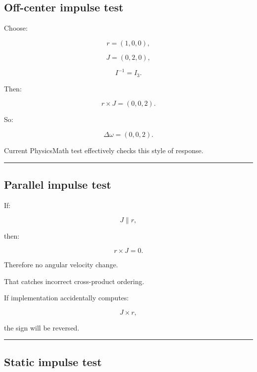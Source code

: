 \subsection{Off-center impulse test}\label{06-engine-ii-ch039-off-center-impulse-test}

\hypertarget{06-engine-ii-ch039-off-center-impulse-test}{}

Choose:

\[
r=(1,0,0),
\]

\[
J=(0,2,0),
\]

\[
I^{-1}=I_3.
\]

Then:

\[
r\times J
=
(0,0,2).
\]

So:

\[
\Delta\omega=(0,0,2).
\]

Current PhysicsMath test effectively checks this style of response.

\begin{center}\rule{0.5\linewidth}{0.5pt}\end{center}

\subsection{Parallel impulse test}\label{06-engine-ii-ch039-parallel-impulse-test}

\hypertarget{06-engine-ii-ch039-parallel-impulse-test}{}

If:

\[
J\parallel r,
\]

then:

\[
r\times J=0.
\]

Therefore no angular velocity change.

That catches incorrect cross-product ordering.

If implementation accidentally computes:

\[
J\times r,
\]

the sign will be reversed.

\begin{center}\rule{0.5\linewidth}{0.5pt}\end{center}

\subsection{Static impulse test}\label{06-engine-ii-ch039-static-impulse-test}

\hypertarget{06-engine-ii-ch039-static-impulse-test}{}

